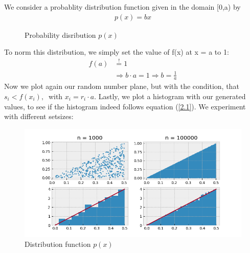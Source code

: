 \documentclass{article}
\begin{document}
We consider a probablity distribution function given in the domain [0,a) by
\begin{align}
    p(x) = bx \label{2.1}
\end{align}
\begin{figure}[H]
    \centering
    \caption{Probability disribution $p(x)$}
\end{figure}
To norm this distribution, we simply set the value of f(x) at x = a to 1:
\begin{align} \nonumber
    f(a) &\stackrel{!}{=} 1 \\
    &\Rightarrow b \cdot a = 1 \Rightarrow b = \frac{1}{a}
\end{align}
Now we plot again our random number plane, but with the condition, that
\(s_i < f(x_i), \ \) with \( x_i = r_i \cdot a\).
Lastly, we plot a histogram with our generated values, to see if the histogram
indeed follows equation (\ref{2.1}). We experiment with different setsizes:
\begin{figure}[H]
    \centering
    \includegraphics[width=12cm]{Fig2-1.png}
    \caption{Distribution function \( p(x) \)}
\end{figure}

\end{document}
